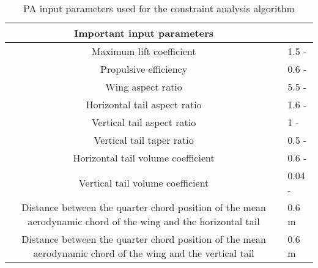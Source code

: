 \begin{table}[H]
\centering
    \begin{tabular}{@{}Cl@{}}
    \toprule
    Important input parameters                                                                                    &        \\ \midrule
    Maximum lift coefficient                                                                                      & 1.5 -  \\
    Propulsive efficiency                                                                                         & 0.6 -  \\
    Wing aspect ratio                                                                                             & 5.5 -  \\
    Horizontal tail aspect ratio                                                                                  & 1.6 -  \\
    Vertical tail aspect ratio                                                                                    & 1 -    \\
    Vertical tail taper ratio                                                                                     & 0.5 -  \\
    Horizontal tail volume coefficient                                                                            & 0.6 -  \\
    Vertical tail volume coefficient                                                                              & 0.04 - \\
    Distance between the quarter chord position of the mean aerodynamic chord of the wing and the horizontal tail & 0.6 m  \\
    Distance between the quarter chord position of the mean aerodynamic chord of the wing and the vertical tail   & 0.6 m  \\ \bottomrule
    \end{tabular}
\caption{PA input parameters used for the constraint analysis algorithm}
\label{tab: pa_input}
\end{table}